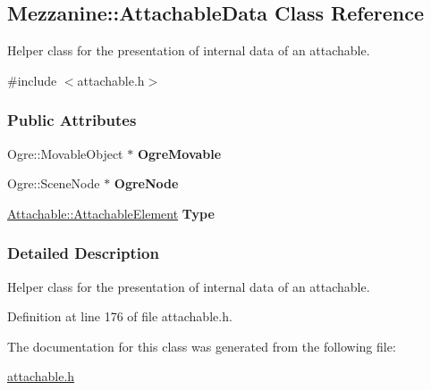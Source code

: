 \hypertarget{structMezzanine_1_1AttachableData}{
\subsection{Mezzanine::AttachableData Class Reference}
\label{structMezzanine_1_1AttachableData}
}


Helper class for the presentation of internal data of an attachable.  




{\ttfamily \#include $<$attachable.h$>$}

\subsubsection*{Public Attributes}
\begin{DoxyCompactItemize}
\item 
\hypertarget{structMezzanine_1_1AttachableData_a298cc82ed33d561b33be81cad682fc00}{
Ogre::MovableObject $\ast$ {\bfseries OgreMovable}}
\label{structMezzanine_1_1AttachableData_a298cc82ed33d561b33be81cad682fc00}

\item 
\hypertarget{structMezzanine_1_1AttachableData_a1d05dec196d63d90226390e91df896a0}{
Ogre::SceneNode $\ast$ {\bfseries OgreNode}}
\label{structMezzanine_1_1AttachableData_a1d05dec196d63d90226390e91df896a0}

\item 
\hypertarget{structMezzanine_1_1AttachableData_a2dcec7ba6c4370e341734ac26bb2b228}{
\hyperlink{classMezzanine_1_1Attachable_a274bd45f9666f6e50f6fdd8a0162bc9e}{Attachable::AttachableElement} {\bfseries Type}}
\label{structMezzanine_1_1AttachableData_a2dcec7ba6c4370e341734ac26bb2b228}

\end{DoxyCompactItemize}


\subsubsection{Detailed Description}
Helper class for the presentation of internal data of an attachable. 

Definition at line 176 of file attachable.h.



The documentation for this class was generated from the following file:\begin{DoxyCompactItemize}
\item 
\hyperlink{attachable_8h}{attachable.h}\end{DoxyCompactItemize}
